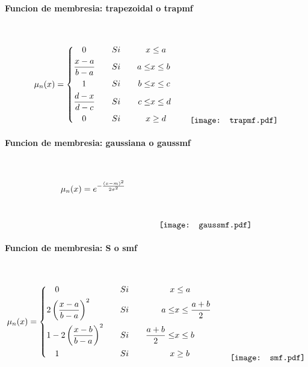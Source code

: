             \paragraph{Funcion de membresia: trapezoidal o trapmf}$\quad$
            
                \begin{equation*}\label{eq:trapmf}
                    \mu_n(x) = \left\{
                        \begin{aligned}
                            &\quad 0  &\quad &Si \quad &  x &\leq a\\
                            &\frac{x - a}{b - a}  &\quad &Si \quad &  a \le &x \leq b \\
                            &\quad 1 &\quad &Si \quad &  b \le &x \leq c \\
                            &\frac{d - x}{d - c}  &\quad &Si \quad & c \le &x \leq d \\
                            &\quad 0  &\quad &Si \quad & x &\geq d
                        \end{aligned}\right.
                        \qquad
                        \raisebox{-15mm}{\texttt{[image: trapmf.pdf]}}
                \end{equation*}

            \paragraph{Funcion de membresia: gaussiana o gaussmf}$\quad$
                
                \begin{equation*}\label{eq:gaussmf}
                    \mu_n(x) = e^{-\frac{(x-m)^2}{2\sigma^2}}
                        \qquad \qquad
                        \raisebox{-15mm}{\texttt{[image: gaussmf.pdf]}}
                \end{equation*}
                
            \paragraph{Funcion de membresia: S o smf}$\quad$
                
                \begin{equation*}\label{eq:smf}
                    \mu_n(x) = \left\{
                        \begin{aligned}
                            &\quad 0  &\quad &Si \quad & x &\leq a\\
                            &2\left(\frac{x - a}{b - a}\right)^2  &\quad &Si \quad &  a \leq &x \leq \frac{a+b}{2} \\
                            &1 - 2\left(\frac{x - b}{b - a}\right)^2  &\quad &Si \quad & \frac{a+b}{2} \leq &x \leq b \\
                            &\quad 1  &\quad &Si \quad & x &\geq b
                        \end{aligned}\right.
                        \qquad
                        \raisebox{-15mm}{\texttt{[image: smf.pdf]}}
                \end{equation*}
            
